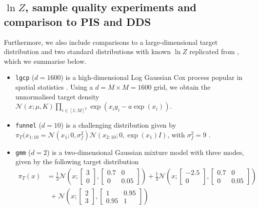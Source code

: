 \subsection{\texorpdfstring{$\ln Z$}{ln Z}, sample quality experiments and comparison to PIS and DDS}
 Furthermore, we also include comparisons to a large-dimensional target distribution and two standard distributions with known $\ln Z$ replicated from \textcite{vargas2023denoising}, which we summarise below.
\begin{itemize}
    \item \texttt{lgcp} ($d=1600$) is a high-dimensional Log Gaussian Cox process popular in spatial statistics \parencite{moller1998log}. Using a $d = M \times M = 1600$ grid, we obtain the unnormalised target density $\mathcal{N}(x ; \mu, K) \prod_{i \in[1: M]^2} \exp \left(x_i y_i-a \exp \left(x_i\right)\right)$.
    \item \texttt{funnel} ($d=10$) is a challenging distribution given by \\ $\pi_T(x_{1:10} = \mathcal{N}(x_1 ; 0, \sigma_f^2) \mathcal{N}(x_{2: 10} ; 0, \exp(x_1) I)$, with $\sigma_f^2 = 9$ \parencite{neal2003slice}.
    \item \texttt{gmm} ($d=2$) is a two-dimensional Gaussian mixture model with three modes, given by the following target distribution 
    \begin{align*}
        \pi_T(x) &= \frac{1}{3} \mathcal{N}\left(x; \begin{bmatrix}3 \\ 0\end{bmatrix}, \begin{bmatrix}
            0.7 & 0 \\ 0 & 0.05
        \end{bmatrix} \right) + \frac{1}{3}\mathcal{N}\left(x; \begin{bmatrix}-2.5 \\ 0\end{bmatrix}, \begin{bmatrix}
            0.7 & 0 \\ 0 & 0.05
        \end{bmatrix} \right) \\ & \ \ + \mathcal{N}\left(x; \begin{bmatrix}2 \\ 3\end{bmatrix}, \begin{bmatrix}
            1 & 0.95 \\ 0.95 & 1
        \end{bmatrix} \right)
    \end{align*}
\end{itemize}

